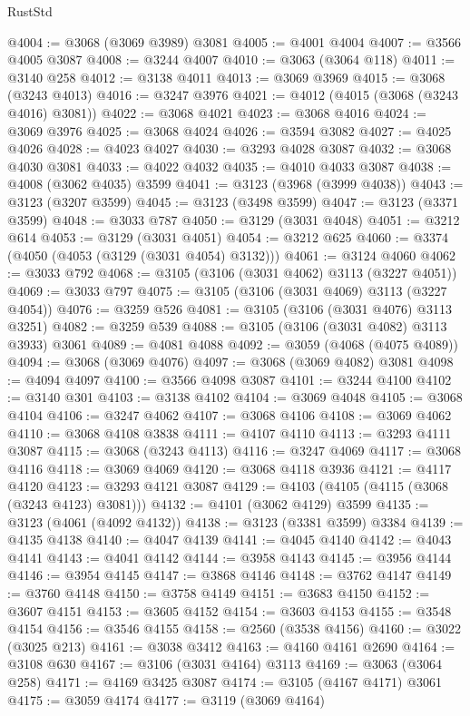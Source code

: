 \begin{lexlean}{RustStd}
\begin{coremodule}
@4004 := @3068 (@3069 @3989) @3081
@4005 := @4001 @4004
@4007 := @3566 @4005 @3087
@4008 := @3244 @4007
@4010 := @3063 (@3064 @118)
@4011 := @3140 @258
@4012 := @3138 @4011
@4013 := @3069 @3969
@4015 := @3068 (@3243 @4013)
@4016 := @3247 @3976
@4021 := @4012 (@4015 (@3068 (@3243 @4016) @3081))
@4022 := @3068 @4021
@4023 := @3068 @4016
@4024 := @3069 @3976
@4025 := @3068 @4024
@4026 := @3594 @3082
@4027 := @4025 @4026
@4028 := @4023 @4027
@4030 := @3293 @4028 @3087
@4032 := @3068 @4030 @3081
@4033 := @4022 @4032
@4035 := @4010 @4033 @3087
@4038 := @4008 (@3062 @4035) @3599
@4041 := @3123 (@3968 (@3999 @4038))
@4043 := @3123 (@3207 @3599)
@4045 := @3123 (@3498 @3599)
@4047 := @3123 (@3371 @3599)
@4048 := @3033 @787
@4050 := @3129 (@3031 @4048)
@4051 := @3212 @614
@4053 := @3129 (@3031 @4051)
@4054 := @3212 @625
@4060 := @3374 (@4050 (@4053 (@3129 (@3031 @4054) @3132)))
@4061 := @3124 @4060
@4062 := @3033 @792
@4068 := @3105 (@3106 (@3031 @4062) @3113 (@3227 @4051))
@4069 := @3033 @797
@4075 := @3105 (@3106 (@3031 @4069) @3113 (@3227 @4054))
@4076 := @3259 @526
@4081 := @3105 (@3106 (@3031 @4076) @3113 @3251)
@4082 := @3259 @539
@4088 := @3105 (@3106 (@3031 @4082) @3113 @3933) @3061
@4089 := @4081 @4088
@4092 := @3059 (@4068 (@4075 @4089))
@4094 := @3068 (@3069 @4076)
@4097 := @3068 (@3069 @4082) @3081
@4098 := @4094 @4097
@4100 := @3566 @4098 @3087
@4101 := @3244 @4100
@4102 := @3140 @301
@4103 := @3138 @4102
@4104 := @3069 @4048
@4105 := @3068 @4104
@4106 := @3247 @4062
@4107 := @3068 @4106
@4108 := @3069 @4062
@4110 := @3068 @4108 @3838
@4111 := @4107 @4110
@4113 := @3293 @4111 @3087
@4115 := @3068 (@3243 @4113)
@4116 := @3247 @4069
@4117 := @3068 @4116
@4118 := @3069 @4069
@4120 := @3068 @4118 @3936
@4121 := @4117 @4120
@4123 := @3293 @4121 @3087
@4129 := @4103 (@4105 (@4115 (@3068 (@3243 @4123) @3081)))
@4132 := @4101 (@3062 @4129) @3599
@4135 := @3123 (@4061 (@4092 @4132))
@4138 := @3123 (@3381 @3599) @3384
@4139 := @4135 @4138
@4140 := @4047 @4139
@4141 := @4045 @4140
@4142 := @4043 @4141
@4143 := @4041 @4142
@4144 := @3958 @4143
@4145 := @3956 @4144
@4146 := @3954 @4145
@4147 := @3868 @4146
@4148 := @3762 @4147
@4149 := @3760 @4148
@4150 := @3758 @4149
@4151 := @3683 @4150
@4152 := @3607 @4151
@4153 := @3605 @4152
@4154 := @3603 @4153
@4155 := @3548 @4154
@4156 := @3546 @4155
@4158 := @2560 (@3538 @4156)
@4160 := @3022 (@3025 @213)
@4161 := @3038 @3412
@4163 := @4160 @4161 @2690
@4164 := @3108 @630
@4167 := @3106 (@3031 @4164) @3113
@4169 := @3063 (@3064 @258)
@4171 := @4169 @3425 @3087
@4174 := @3105 (@4167 @4171) @3061
@4175 := @3059 @4174
@4177 := @3119 (@3069 @4164)

\end{coremodule}
\end{lexlean}
